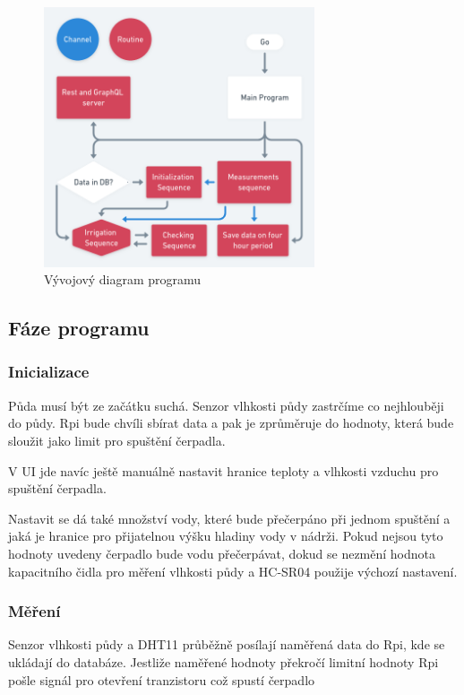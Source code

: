 \documentclass[11pt,a4paper]{article}
\begin{document}
\begin{figure}[h]
	\centering
	\includegraphics[width=8cm]{go.png}
	\caption*{Vývojový diagram programu}
\end{figure}

\subsection*{Fáze programu}

\subsubsection*{Inicializace}

Půda musí být ze začátku suchá. Senzor vlhkosti půdy zastrčíme co nejhlouběji do půdy. Rpi bude chvíli sbírat data a pak je zprůměruje do hodnoty, která bude sloužit jako limit pro spuštění čerpadla.

V UI jde navíc ještě manuálně nastavit hranice teploty a vlhkosti vzduchu pro spuštění čerpadla.

Nastavit se dá také množství vody, které bude přečerpáno při jednom spuštění a jaká je hranice pro přijatelnou výšku hladiny vody v nádrži. Pokud nejsou tyto hodnoty uvedeny čerpadlo bude vodu přečerpávat, dokud se nezmění hodnota kapacitního čidla pro měření vlhkosti půdy a HC-SR04 použije výchozí nastavení.

\subsubsection*{Měření}

Senzor vlhkosti půdy a DHT11 průběžně posílají naměřená data do Rpi, kde se ukládají do databáze. Jestliže naměřené hodnoty překročí limitní hodnoty Rpi pošle signál pro otevření tranzistoru což spustí čerpadlo
\end{document}
